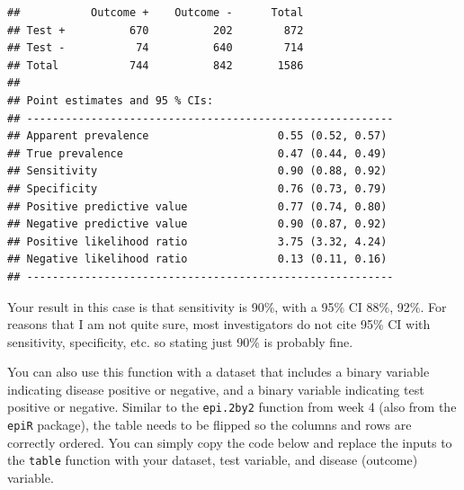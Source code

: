 \documentclass[]{book}
\newenvironment{Shaded}{\begin{snugshade}}{\end{snugshade}}
\newcommand{\CommentTok}[1]{\textcolor[rgb]{0.56,0.35,0.01}{\textit{#1}}}
\newcommand{\DataTypeTok}[1]{\textcolor[rgb]{0.13,0.29,0.53}{#1}}
\newcommand{\DecValTok}[1]{\textcolor[rgb]{0.00,0.00,0.81}{#1}}
\newcommand{\KeywordTok}[1]{\textcolor[rgb]{0.13,0.29,0.53}{\textbf{#1}}}
\newcommand{\NormalTok}[1]{#1}
\newcommand{\OperatorTok}[1]{\textcolor[rgb]{0.81,0.36,0.00}{\textbf{#1}}}
\newcommand{\StringTok}[1]{\textcolor[rgb]{0.31,0.60,0.02}{#1}}
\begin{document}
\begin{verbatim}
##           Outcome +    Outcome -      Total
## Test +          670          202        872
## Test -           74          640        714
## Total           744          842       1586
## 
## Point estimates and 95 % CIs:
## ---------------------------------------------------------
## Apparent prevalence                    0.55 (0.52, 0.57)
## True prevalence                        0.47 (0.44, 0.49)
## Sensitivity                            0.90 (0.88, 0.92)
## Specificity                            0.76 (0.73, 0.79)
## Positive predictive value              0.77 (0.74, 0.80)
## Negative predictive value              0.90 (0.87, 0.92)
## Positive likelihood ratio              3.75 (3.32, 4.24)
## Negative likelihood ratio              0.13 (0.11, 0.16)
## ---------------------------------------------------------
\end{verbatim}

Your result in this case is that sensitivity is 90\%, with a 95\% CI
88\%, 92\%. For reasons that I am not quite sure, most investigators do
not cite 95\% CI with sensitivity, specificity, etc. so stating just
90\% is probably fine.

You can also use this function with a dataset that includes a binary
variable indicating disease positive or negative, and a binary variable
indicating test positive or negative. Similar to the \texttt{epi.2by2}
function from week 4 (also from the \texttt{epiR} package), the table
needs to be flipped so the columns and rows are correctly ordered. You
can simply copy the code below and replace the inputs to the
\texttt{table} function with your dataset, test variable, and disease
(outcome) variable.

\begin{Shaded}
\end{Shaded}
\end{document}
